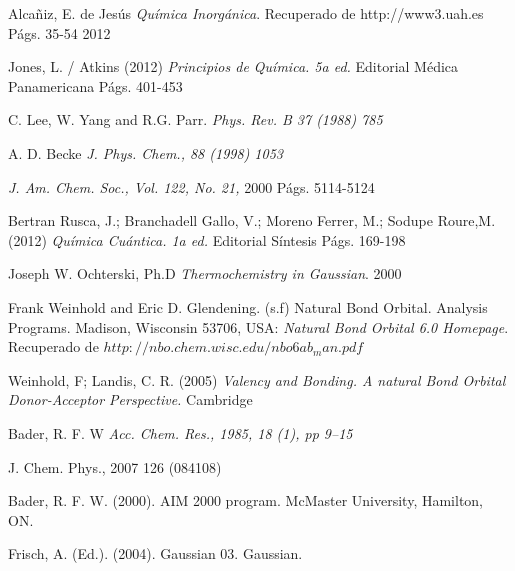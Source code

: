 \begin{thebibliography}{9}

Alcañiz, E. de Jesús
\textit{Química Inorgánica}. 
Recuperado de http://www3.uah.es Págs. 35-54
2012

Jones, L. / Atkins (2012)
\textit{Principios de Química. 5a ed.} Editorial Médica Panamericana
Págs. 401-453

C. Lee, W. Yang and R.G. Parr.
\textit{ Phys. Rev. B 37 (1988) 785}

A. D. Becke
\textit{J. Phys. Chem., 88 (1998) 1053}

\textit{J. Am. Chem. Soc., Vol. 122, No. 21, }
2000 Págs. 5114-5124

Bertran Rusca, J.; Branchadell Gallo, V.; Moreno Ferrer, M.; Sodupe Roure,M. (2012)
\textit{Química Cuántica. 1a ed.} Editorial Síntesis
Págs. 169-198

Joseph W. Ochterski, Ph.D
\textit{Thermochemistry in Gaussian}.
2000

Frank Weinhold and Eric D. Glendening. (s.f) Natural Bond Orbital. Analysis Programs. Madison, Wisconsin 53706, USA: 
\textit {Natural Bond Orbital 6.0 Homepage}. Recuperado de $http://nbo.chem.wisc.edu/nbo6ab_man.pdf$

Weinhold, F; Landis, C. R. (2005) 
\textit{Valency and Bonding. A natural Bond Orbital Donor-Acceptor Perspective.}
Cambridge

Bader, R. F. W
\textit{Acc. Chem. Res., 1985, 18 (1), pp 9–15}

J. Chem. Phys., 2007 126 (084108)

Bader, R. F. W. (2000). AIM 2000 program. McMaster University, Hamilton, ON.

Frisch, A. (Ed.). (2004). Gaussian 03. Gaussian.

\end{thebibliography}
